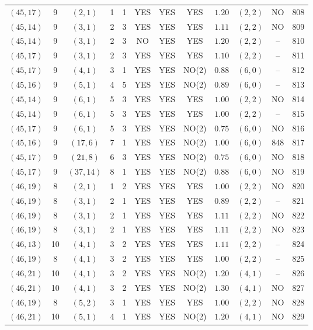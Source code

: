 \begin{longtable}{|c|c|c|c|c|c|c|c|c|c|c|c|}
$(45,17)$ & 9 & $(2,1)$ & 1 & 1 & YES & YES & YES & $1.20$ & $(2,2)$ & NO & 808\\
$(45,14)$ & 9 & $(3,1)$ & 2 & 3 & YES & YES & YES & $1.11$ & $(2,2)$ & NO & 809\\
$(45,14)$ & 9 & $(3,1)$ & 2 & 3 & NO & YES & YES & $1.20$ & $(2,2)$ & -- & 810\\
$(45,17)$ & 9 & $(3,1)$ & 2 & 3 & YES & YES & YES & $1.10$ & $(2,2)$ & -- & 811\\
$(45,17)$ & 9 & $(4,1)$ & 3 & 1 & YES & YES & NO(2) & $0.88$ & $(6,0)$ & -- & 812\\
$(45,16)$ & 9 & $(5,1)$ & 4 & 5 & YES & YES & NO(2) & $0.89$ & $(6,0)$ & -- & 813\\
$(45,14)$ & 9 & $(6,1)$ & 5 & 3 & YES & YES & YES & $1.00$ & $(2,2)$ & NO & 814\\
$(45,14)$ & 9 & $(6,1)$ & 5 & 3 & YES & YES & YES & $1.00$ & $(2,2)$ & -- & 815\\
$(45,17)$ & 9 & $(6,1)$ & 5 & 3 & YES & YES & NO(2) & $0.75$ & $(6,0)$ & NO & 816\\
$(45,16)$ & 9 & $(17,6)$ & 7 & 1 & YES & YES & NO(2) & $1.00$ & $(6,0)$ & 848 & 817\\
$(45,17)$ & 9 & $(21,8)$ & 6 & 3 & YES & YES & NO(2) & $0.75$ & $(6,0)$ & NO & 818\\
$(45,17)$ & 9 & $(37,14)$ & 8 & 1 & YES & YES & NO(2) & $0.88$ & $(6,0)$ & NO & 819\\
$(46,19)$ & 8 & $(2,1)$ & 1 & 2 & YES & YES & YES & $1.00$ & $(2,2)$ & NO & 820\\
$(46,19)$ & 8 & $(3,1)$ & 2 & 1 & YES & YES & YES & $0.89$ & $(2,2)$ & -- & 821\\
$(46,19)$ & 8 & $(3,1)$ & 2 & 1 & YES & YES & YES & $1.11$ & $(2,2)$ & NO & 822\\
$(46,19)$ & 8 & $(3,1)$ & 2 & 1 & YES & YES & YES & $1.11$ & $(2,2)$ & NO & 823\\
$(46,13)$ & 10 & $(4,1)$ & 3 & 2 & YES & YES & YES & $1.11$ & $(2,2)$ & -- & 824\\
$(46,19)$ & 8 & $(4,1)$ & 3 & 2 & YES & YES & YES & $1.00$ & $(2,2)$ & -- & 825\\
$(46,21)$ & 10 & $(4,1)$ & 3 & 2 & YES & YES & NO(2) & $1.20$ & $(4,1)$ & -- & 826\\
$(46,21)$ & 10 & $(4,1)$ & 3 & 2 & YES & YES & NO(2) & $1.30$ & $(4,1)$ & NO & 827\\
$(46,19)$ & 8 & $(5,2)$ & 3 & 1 & YES & YES & YES & $1.00$ & $(2,2)$ & NO & 828\\
$(46,21)$ & 10 & $(5,1)$ & 4 & 1 & YES & YES & NO(2) & $1.20$ & $(4,1)$ & NO & 829\\

\end{longtable}
